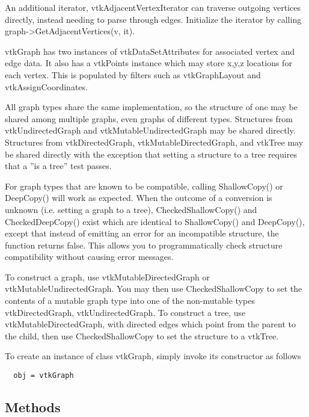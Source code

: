  An additional iterator, vtkAdjacentVertexIterator can traverse outgoing vertices
 directly, instead needing to parse through edges. Initialize the iterator by
 calling graph->GetAdjacentVertices(v, it).

 vtkGraph has two instances of vtkDataSetAttributes for associated
 vertex and edge data. It also has a vtkPoints instance which may store
 x,y,z locations for each vertex. This is populated by filters such as
 vtkGraphLayout and vtkAssignCoordinates.

 All graph types share the same implementation, so the structure of one
 may be shared among multiple graphs, even graphs of different types.
 Structures from vtkUndirectedGraph and vtkMutableUndirectedGraph may be
 shared directly.  Structures from vtkDirectedGraph, vtkMutableDirectedGraph,
 and vtkTree may be shared directly with the exception that setting a
 structure to a tree requires that a ''is a tree'' test passes.

 For graph types that are known to be compatible, calling ShallowCopy()
 or DeepCopy() will work as expected.  When the outcome of a conversion
 is unknown (i.e. setting a graph to a tree), CheckedShallowCopy() and
 CheckedDeepCopy() exist which are identical to ShallowCopy() and DeepCopy(),
 except that instead of emitting an error for an incompatible structure,
 the function returns false.  This allows you to programmatically check
 structure compatibility without causing error messages.

 To construct a graph, use vtkMutableDirectedGraph or
 vtkMutableUndirectedGraph. You may then use CheckedShallowCopy
 to set the contents of a mutable graph type into one of the non-mutable
 types vtkDirectedGraph, vtkUndirectedGraph.
 To construct a tree, use vtkMutableDirectedGraph, with directed edges
 which point from the parent to the child, then use CheckedShallowCopy
 to set the structure to a vtkTree.


To create an instance of class vtkGraph, simply
invoke its constructor as follows
\begin{verbatim}
  obj = vtkGraph
\end{verbatim}
\subsection{Methods}

